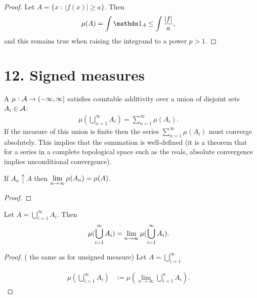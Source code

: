 \begin{proof}
  Let $A = \{x ~:~ |f(x)| \geq a\}$. Then
  \begin{align*}
    \mu(A)
    = \int \ind_A
    \leq \int \frac{|f|}{a},
  \end{align*}
  and this remains true when raising the integrand to a power $p > 1$.
\end{proof}

\section{12. Signed measures}

\begin{definition}
  A  $\mu:\mathcal A \to (-\infty, \infty]$ satisfies countable additivity over a union of disjoint
  sets $A_i \in \mathcal A$:
  \begin{align*}
    \mu(\bigcup_{n=1}^\infty A_i) = \sum_{n=1}^{\infty} \mu(A_i).
  \end{align*}
  If the measure of this union is finite then the series $\sum_{n=1}^{\infty} \mu(A_i)$ must converge
  absolutely. This implies that the summation is well-defined (it is a theorem that for a series in a complete
  topological space such as the reals, absolute convergence implies unconditional convergence).
\end{definition}

\begin{theorem}
  If $A_n \uparrow A$ then $\limn \mu(A_n) = \mu(A)$.
\end{theorem}

\begin{proof}
\end{proof}

\begin{theorem}
  Let $A = \bigcup_{i=1}^\infty A_i$. Then
  \begin{align*}
    \mu(\bigcup_{i=1}^\infty A_i) = \limn \mu(\bigcup_{i=1}^\infty A_i).
  \end{align*}
\end{theorem}

\begin{proof}
  ( the same as for unsigned measure)
  Let $A = \bigcup_{i=1}^\infty$

  \begin{align*}
    \mu(\bigcup_{i=1}^\infty A_i)
    &:= \mu(\lim_{n\to\infty} \bigcup_{i=1}^n A_i) .
  \end{align*}

\end{proof}

